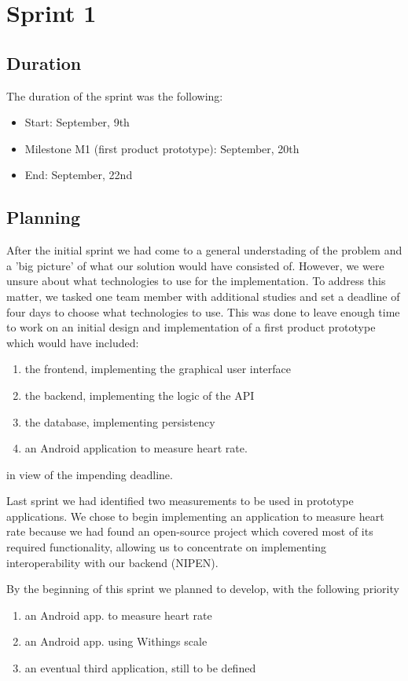 
\chapter{Sprint 1}
\label{Sprint1}

\section{Duration}
The duration of the sprint was the following:
\begin{itemize}
\item Start: September, 9th
\item Milestone M1 (first product prototype): September, 20th
\item End: September, 22nd
\end{itemize}

\section{Planning}

After the initial sprint we had come to a general understading of the problem and a 'big picture'
of what our solution would have consisted of. However, we were unsure about what technologies to use
for the implementation. To address this matter, we tasked one team member with additional studies and set
a deadline of four days to choose what technologies to use.%
This was done to leave enough time to work on an initial design and implementation of a first product prototype
which would have included:
\begin{enumerate}
\item the frontend, implementing the graphical user interface
\item the backend, implementing the logic of the API
\item the database, implementing persistency
\item an Android application to measure heart rate.
\end{enumerate}
in view of the impending deadline.

Last sprint we had identified two measurements to be used in prototype applications.
We chose to begin implementing an application to measure heart rate because
we had found an open-source project which covered most of its required functionality,
allowing us to concentrate on implementing interoperability with our backend (NIPEN).

By the beginning of this sprint we planned to develop, with the following priority
\begin{enumerate}[1.]
\item an Android app. to measure heart rate
\item an Android app. using Withings scale
\item an eventual third application, still to be defined
\end{enumerate}




